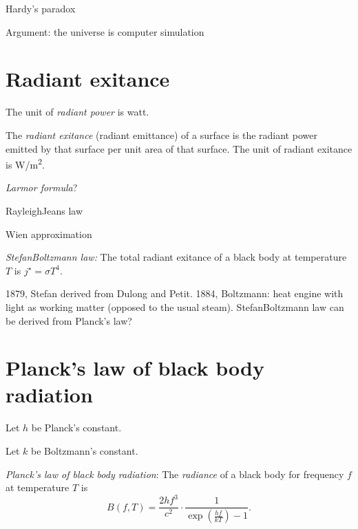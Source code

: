 Hardy's paradox


Argument: the universe is computer simulation


\section{Radiant exitance}

%
%
%
The unit of \emph{radiant power} is watt.

%
%
The \emph{radiant exitance} (radiant emittance)
of a surface is the radiant power
emitted by that surface
per unit area of that surface.
%
%
The unit of radiant exitance is \si{W/m^2}.

\emph{Larmor formula}?

Rayleigh\textendash{}Jeans law

Wien approximation


%
%
%
\emph{Stefan\textendash{}Boltzmann law:}
The total radiant exitance of a black body at temperature \(T\) is \( j^\star = \sigma T^4 \).

1879, Stefan derived from Dulong and Petit.
1884, Boltzmann: heat engine with light as working matter (opposed to the usual steam).
Stefan\textendash{}Boltzmann law can be derived from Planck's law?

\section{Planck's law of black body radiation}



Let \(h\) be Planck's constant.

Let \(k\) be Boltzmann's constant.

%
%
\emph{Planck's law of black body radiation}:
The \emph{radiance} of a black body for frequency \(f\) at temperature \(T\) is
\begin{equation}
    B(f,T) = \frac{2hf^3}{c^2} \cdot \frac{1}{\exp\left(\frac{hf}{kT}\right) - 1}.
\end{equation}
